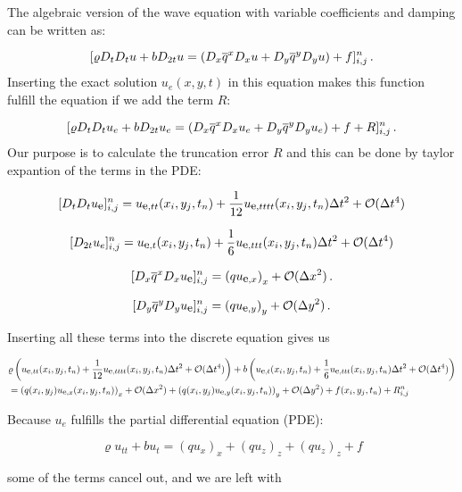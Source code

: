 \documentclass[letterpaper,10pt,english]{/usr/share/sphinx/texinputs/sphinxhowto}
\begin{document}
The algebraic version of the wave equation with variable coefficients
and damping can be written as:

\[
[\varrho D_tD_t u + b D_{2t} u  = (D_x\overline{q}^x D_x u +
D_y\overline{q}^y D_yu ) + f]^n_{i,j}
\thinspace .
\] Inserting the exact solution $u_e(x,y,t)$ in this equation makes this
function fulfill the equation if we add the term $R$:

\[
[\varrho D_tD_t u_e + b D_{2t} u_e  = (D_x\overline{q}^x D_x u_e +
D_y\overline{q}^y D_yu_e ) + f+ R]^n_{i,j}
\thinspace .
\] Our purpose is to calculate the truncation error $R$ and this can be
done by taylor expantion of the terms in the PDE:

\[ 
[D_t D_t{u_{\small\mbox{e}}}]_{i,j}^n = {u_{\small\mbox{e}, tt}}(x_i,y_j,t_n) +
\frac{1}{12}{u_{\small\mbox{e}, tttt}}(x_i,y_j,t_n)\Delta t^2 + {\mathcal{O}(\Delta t^4)}
\]

\[
\lbrack D_{2t}u_e \rbrack^n_{i,j} = u_{\small\mbox{e}, t}(x_i,y_j,t_n) 
+\frac{1}{6}u_{\small\mbox{e}, ttt}(x_i,y_j,t_n) \Delta t^2 + {\mathcal{O}(\Delta t^4)}
\]

\[ 
\lbrack D_x \overline{q}^{x}D_x {u_{\small\mbox{e}}} \rbrack^n_{i,j} 
=\left(q{u_{\small\mbox{e}, x}}\right)_{x} +
{\mathcal{O}(\Delta x^2)}{\thinspace .}
\]

\[ 
\lbrack D_y \overline{q}^{y}D_y {u_{\small\mbox{e}}} \rbrack^n_{i,j} 
=\left(q{u_{\small\mbox{e}, y}}\right)_{y} +
{\mathcal{O}(\Delta y^2)}{\thinspace .}
\]

Inserting all these terms into the discrete equation gives us

\begin{align*}
&\varrho\left({u_{\small\mbox{e}, tt}}(x_i,y_j,t_n) +
\frac{1}{12}{u_{\small\mbox{e}, tttt}}(x_i,y_j,t_n)\Delta t^2 + {\mathcal{O}(\Delta t^4)}
\right)
+ b \left(u_{\small\mbox{e}, t}(x_i,y_j,t_n) +\frac{1}{6}u_{\small\mbox{e}, ttt}(x_i,y_j,t_n) \Delta t^2 + {\mathcal{O}(\Delta t^4)} \right) \\
&= \left(q(x_i,y_j){u_{\small\mbox{e}, x}}(x_i,y_j,t_n)\right)_{x} +{\mathcal{O}(\Delta x^2)} 
+ \left(q(x_i,y_j){u_{\small\mbox{e}, y}}(x_i,y_j,t_n)\right)_{y} + {\mathcal{O}(\Delta y^2)}
+f(x_i,y_j,t_n)+R^n_{i,j}
\end{align*}

Because $u_e$ fulfills the partial differential equation (PDE):

\[
\varrho u_{tt} + b u_{t}= (q u_x)_x + (q u_z)_z + (q u_z)_z + f
\]

some of the terms cancel out, and we are left with
\end{document}
